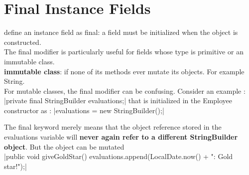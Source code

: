\documentclass[12pt,a4paper]{article}
\begin{document}
\section{Final Instance Fields}

define an instance field as final: a field must be initialized when the object is constructed.\\

The final modifier is particularly useful for fields whose type is {\color{red}primitive} or an {\color{red}immutable class}. \\

\textbf{immutable class}: if none of its methods ever mutate its objects. For example String. \\

For mutable classes, the final modifier can be confusing. Consider  an example :
|private final StringBuilder evaluations;|
that is initialized in the Employee constructor as :
|evaluations = new StringBuilder();|

The final keyword merely means that the object reference stored in the evaluations variable will \textbf{never again refer to a different StringBuilder object}. But the object can be mutated\\

|public void giveGoldStar() {evaluations.append(LocalDate.now() + ": Gold star!\n");}|



%
%
\end{document}
